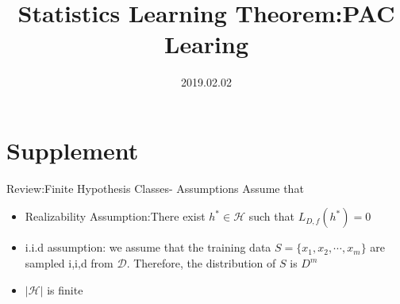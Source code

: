 \documentclass{beamer}
\title[Introduction]{Statistics Learning Theorem:PAC Learing}
\author{}
\institute{}
\date{2019.02.02}
\begin{document}
\begin{frame}
  \titlepage
\end{frame}


\section{Supplement}

\begin{frame}{Review:Finite Hypothesis Classes- Assumptions}
Assume that 
\begin{itemize}
	\item Realizability Assumption:There exist $h^* \in \mathcal{H}$ such that $L_{D,f}(h^*)=0$
	\item i.i.d assumption: we assume that the training data $S = \{x_1,x_2, \cdots,x_m\}$ are sampled i,i,d from $\mathcal{D}$. Therefore, the distribution of $S$ is $D^m$
	\item $ |\mathcal{H}|$ is finite
\end{itemize}

\end{frame}
\end{document}
